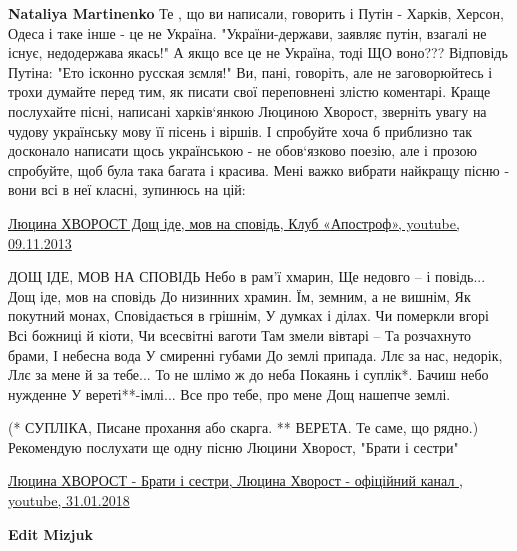 \begin{itemize}
\begin{itemize}
\begin{itemize}
\textbf{Nataliya Martinenko} Те , що ви написали, говорить і Путін - Харків,
Херсон, Одеса і таке інше - це не Україна. "України-держави, заявляє путін,
взагалі не існує, недодержава якась!" А якщо все це не Україна, тоді ЩО воно???
Відповідь Путіна: "Ето ісконно русская зємля!" Ви, пані, говоріть, але не
заговорюйтесь і трохи думайте перед тим, як писати свої переповнені злістю
коментарі. Краще послухайте пісні, написані харків`янкою Люциною Хворост,
зверніть увагу на чудову українську мову її пісень і віршів. І спробуйте хоча б
приблизно так досконало написати щось українською - не обов`язково поезію, але
і прозою спробуйте, щоб була така багата і красива. Мені важко вибрати найкращу
пісню - вони всі в неї класні, зупинюсь на цій:

\href{https://www.youtube.com/watch?v=fbQ59h8vQ_g}{%
Люцина ХВОРОСТ Дощ іде, мов на сповідь, Клуб «Апостроф», youtube, 09.11.2013%
}

 

\obeycr
ДОЩ ІДЕ, МОВ НА СПОВІДЬ
\smallskip
Небо в рам'ї хмарин,
Ще недовго – і повідь...
Дощ іде, мов на сповідь
До низинних храмин.
\smallskip
Їм, земним, а не вишнім,
Як покутний монах,
Сповідається в грішнім,
У думках і ділах.
\smallskip
Чи померкли вгорі
Всі божниці й кіоти,
Чи всесвітні ваготи
Там змели вівтарі –
Та розчахнуто брами,
І небесна вода
У смиренні губами
До землі припада.
\smallskip
Ллє за нас, недорік,
Ллє за мене й за тебе...
То не шлімо ж до неба
Покаянь і суплік*.
\smallskip
Бачиш небо нужденне
У вереті**-імлі...
Все про тебе, про мене
Дощ нашепче землі. 
\restorecr

(* СУПЛІКА, Писане прохання або скарга. ** ВЕРЕТА. Те саме, що рядно.)
Рекомендую послухати ще одну пісню Люцини Хворост, "Брати і сестри"

\href{https://www.youtube.com/watch?v=oK3EOJdQZNQ}{%
Люцина ХВОРОСТ - Брати і сестри, Люцина Хворост - офіційний канал , youtube, 31.01.2018%
}

 
\textbf{Edit Mizjuk} 


\end{itemize}
\end{itemize}
\end{itemize}
